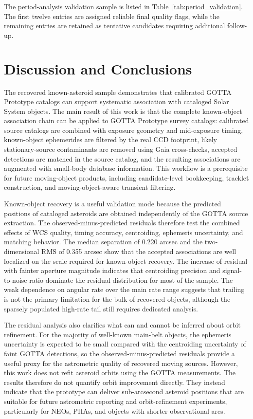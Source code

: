\documentclass[referee]{raa}
\begin{document}
The period-analysis validation sample is listed in Table~\ref{tab:period_validation}. The first twelve entries are assigned reliable final quality flags, while the remaining entries are retained as tentative candidates requiring additional follow-up.


\FloatBarrier

\section{Discussion and Conclusions}
\label{sec:discussion}

The recovered known-asteroid sample demonstrates that calibrated GOTTA Prototype catalogs can support systematic association with cataloged Solar System objects. The main result of this work is that the complete known-object association chain can be applied to GOTTA Prototype survey catalogs: calibrated source catalogs are combined with exposure geometry and mid-exposure timing, known-object ephemerides are filtered by the real CCD footprint, likely stationary-source contaminants are removed using Gaia cross-checks, accepted detections are matched in the source catalog, and the resulting associations are augmented with small-body database information. This workflow is a prerequisite for future moving-object products, including candidate-level bookkeeping, tracklet construction, and moving-object-aware transient filtering.

Known-object recovery is a useful validation mode because the predicted positions of cataloged asteroids are obtained independently of the GOTTA source extraction. The observed-minus-predicted residuals therefore test the combined effects of WCS quality, timing accuracy, centroiding, ephemeris uncertainty, and matching behavior. The median separation of 0.220 arcsec and the two-dimensional RMS of 0.355 arcsec show that the accepted associations are well localized on the scale required for known-object recovery. The increase of residual with fainter aperture magnitude indicates that centroiding precision and signal-to-noise ratio dominate the residual distribution for most of the sample. The weak dependence on angular rate over the main rate range suggests that trailing is not the primary limitation for the bulk of recovered objects, although the sparsely populated high-rate tail still requires dedicated analysis.

The residual analysis also clarifies what can and cannot be inferred about orbit refinement. For the majority of well-known main-belt objects, the ephemeris uncertainty is expected to be small compared with the centroiding uncertainty of faint GOTTA detections, so the observed-minus-predicted residuals provide a useful proxy for the astrometric quality of recovered moving sources. However, this work does not refit asteroid orbits using the GOTTA measurements. The results therefore do not quantify orbit improvement directly. They instead indicate that the prototype can deliver sub-arcsecond asteroid positions that are suitable for future astrometric reporting and orbit-refinement experiments, particularly for NEOs, PHAs, and objects with shorter observational arcs.
\end{document}
